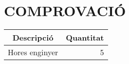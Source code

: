 \chapter{\uppercase{Comprovació}}

\begin{table}[H]
  \begin{center}
    \begin{tabularx} {\textwidth} {|X|r|} \hline
  \multicolumn{1}{|c|}{Descripció} &  \multicolumn{1}{c|}{Quantitat}\\ \hline \hline
    Hores enginyer & 5 \\ \hline
    \end{tabularx}%
  \end{center}

  \label{tab:addlabel}%
\end{table}%





\clearpage